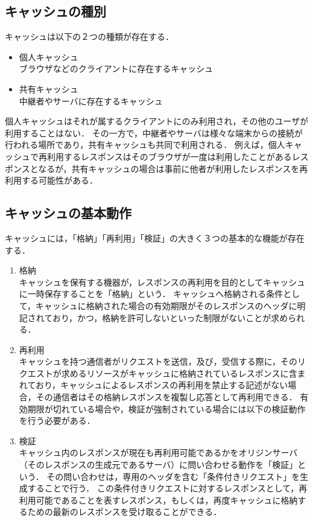\documentclass[12pt,a4paper]{jbook}
\begin{document}
\subsection{キャッシュの種別}
キャッシュは以下の２つの種類が存在する．
\begin{itemize}
\item 個人キャッシュ \\
ブラウザなどのクライアントに存在するキャッシュ
\item 共有キャッシュ \\
中継者やサーバに存在するキャッシュ
\end{itemize}
個人キャッシュはそれが属するクライアントにのみ利用され，その他のユーザが利用することはない．
その一方で，中継者やサーバは様々な端末からの接続が行われる場所であり，共有キャッシュも共同で利用される．
例えば，個人キャッシュで再利用するレスポンスはそのブラウザが一度は利用したことがあるレスポンスとなるが，共有キャッシュの場合は事前に他者が利用したレスポンスを再利用する可能性がある．

\subsection{キャッシュの基本動作}
キャッシュには，「格納」「再利用」「検証」の大きく３つの基本的な機能が存在する．

\begin{enumerate}
\item 格納\\
キャッシュを保有する機器が，レスポンスの再利用を目的としてキャッシュに一時保存することを「格納」という．
キャッシュへ格納される条件として，キャッシュに格納された場合の有効期限がそのレスポンスのヘッダに明記されており，かつ，格納を許可しないといった制限がないことが求められる．
\item 再利用\\
キャッシュを持つ通信者がリクエストを送信，及び，受信する際に，そのリクエストが求めるリソースがキャッシュに格納されているレスポンスに含まれており，キャッシュによるレスポンスの再利用を禁止する記述がない場合，その通信者はその格納レスポンスを複製し応答として再利用できる．
有効期限が切れている場合や，検証が強制されている場合には以下の検証動作を行う必要がある．
\item 検証\\
キャッシュ内のレスポンスが現在も再利用可能であるかをオリジンサーバ（そのレスポンスの生成元であるサーバ）に問い合わせる動作を「検証」という．
その問い合わせは，専用のヘッダを含む「条件付きリクエスト」を生成することで行う．
この条件付きリクエストに対するレスポンスとして，再利用可能であることを表すレスポンス，もしくは，再度キャッシュに格納するための最新のレスポンスを受け取ることができる．
\end{enumerate}
\end{document}
